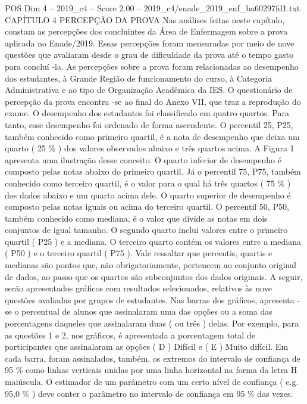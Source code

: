 \begin{textsample}{POS Dim 4 – 2019\_c4 – Score 2.00 – 2019\_c4/enade\_2019\_enf\_ba60297fd1.txt}  \label{ex:f4_pos_113}
CAPÍTULO 4 PERCEPÇÃO DA PROVA Nas análises feitas neste capítulo, constam as percepções dos concluintes da Área de Enfermagem sobre a prova aplicada no Enade/2019.
Essas percepções foram mensuradas por meio de nove questões que avaliaram desde o grau de dificuldade da prova até o tempo gasto para concluí -la.
As percepções sobre a prova foram relacionadas ao desempenho dos estudantes, à Grande Região de funcionamento do curso, à Categoria Administrativa e ao tipo de Organização Acadêmica da IES.
O questionário de percepção da prova encontra -se ao final do Anexo VII, que traz a reprodução do exame.
O desempenho dos estudantes foi classificado em quatro quartos.
Para tanto, esse desempenho foi ordenado de forma ascendente.
O percentil 25, P25, também conhecido como primeiro quartil, é a nota de desempenho que deixa um quarto ( 25 \% ) dos valores observados abaixo e três quartos acima.
A Figura 1 apresenta uma ilustração desse conceito.
O quarto inferior de desempenho é composto pelas notas abaixo do primeiro quartil.
Já o percentil 75, P75, também conhecido como terceiro quartil, é o valor para o qual há três quartos ( 75 \% ) dos dados abaixo e um quarto acima dele.
O quarto superior de desempenho é composto pelas notas iguais ou acima do terceiro quartil.
O percentil 50, P50, também conhecido como mediana, é o valor que divide as notas em dois conjuntos de igual tamanho.
O segundo quarto inclui valores entre o primeiro quartil ( P25 ) e a mediana.
O terceiro quarto contém os valores entre a mediana ( P50 ) e o terceiro quartil ( P75 ).
Vale ressaltar que percentis, quartis e medianas são pontos que, não obrigatoriamente, pertencem ao conjunto original de dados, ao passo que os quartos são subconjuntos dos dados originais.
A seguir, serão apresentados gráficos com resultados selecionados, relativos às nove questões avaliadas por grupos de estudantes.
Nas barras dos gráficos, apresenta -se o percentual de alunos que assinalaram uma das opções ou a soma das porcentagens daqueles que assinalaram duas ( ou três ) delas.
Por exemplo, para as questões 1 e 2, nos gráficos, é apresentada a porcentagem total de participantes que assinalaram as opções ( D ) Difícil e ( E ) Muito difícil.
Em cada barra, foram assinalados, também, os extremos do intervalo de confiança de 95 \% como linhas verticais unidas por uma linha horizontal na forma da letra H maiúscula.
O estimador de um parâmetro com um certo nível de confiança ( e.g. 95,0 \% ) deve conter o parâmetro no intervalo de confiança em 95 \% das vezes.

\end{textsample}
